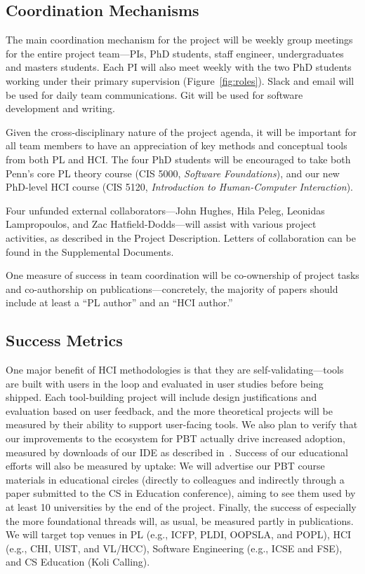 \subsection*{Coordination Mechanisms}

The main coordination mechanism for the project will be weekly group
meetings for the entire project team---PIs, PhD students, staff
engineer, undergraduates and masters students.
%
Each PI will also meet weekly with the two PhD students working under
their primary supervision (Figure~\ref{fig:roles}).
%
Slack and email will be used for daily team communications.  Git will
be used for software development and writing.

Given the cross-disciplinary nature of the project agenda, it will be
important for all team members to have an appreciation of key methods
and conceptual tools from both PL and HCI.  The four PhD students will
be encouraged to take both Penn's core PL theory course (CIS 5000,
{\em Software Foundations}), and our new PhD-level HCI course (CIS
5120, {\em Introduction to Human-Computer Interaction}).

Four unfunded external collaborators---John Hughes, Hila Peleg,
Leonidas Lampropoulos, and Zac Hatfield-Dodds---will assist with
various project activities, as described in the Project Description.
Letters of collaboration can be found in the Supplemental Documents.

One measure of success in team coordination will be co-ownership of
project tasks and co-authorship on publications---concretely, the
majority of papers should include at least a ``PL author''
and an ``HCI author.''

\subsection*{Success Metrics}

One major benefit of
HCI methodologies is that they are self-validating---tools are built with users
in the loop and evaluated in user studies before being shipped.
Each tool-building project will include design justifications and
evaluation based on user feedback, and the more theoretical
projects will be measured by their ability to support user-facing tools.
%
We also plan to verify that our improvements to the ecosystem for PBT
actually drive increased adoption, measured by
downloads of our \tyche{} IDE as described in~.
%
Success of our educational efforts will also be measured by uptake: We
will advertise our PBT course materials in educational circles
(directly to colleagues and indirectly through a paper
submitted to the CS in Education conference), aiming to see them used
by at least 10 universities by the end of the project.
%
Finally, the
success of especially the more foundational threads will, as usual, be measured
partly in publications.  We will target top venues in PL (e.g., ICFP, PLDI,
OOPSLA, and POPL), HCI (e.g., CHI, UIST, and VL/HCC), Software Engineering
(e.g., ICSE and FSE), and CS Education (Koli Calling).

\clearpage
